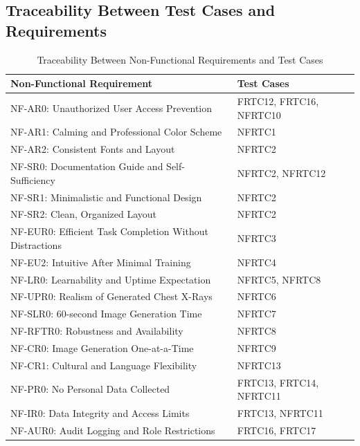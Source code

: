 \documentclass[12pt, titlepage]{article}
\begin{document}
\subsection{Traceability Between Test Cases and Requirements}

\begin{table}[H]
  \centering
  \caption{Traceability Between Non-Functional Requirements and Test Cases}
  \renewcommand{\arraystretch}{1.3}
  \begin{tabularx}{\textwidth}{|>{\raggedright\arraybackslash}X|>{\raggedright\arraybackslash}m{}|}
    \hline
    \textbf{Non-Functional Requirement} & \textbf{Test Cases} \\
    \hline
    NF-AR0: Unauthorized User Access Prevention & FRTC12, FRTC16, NFRTC10 \\
    \hline
    NF-AR1: Calming and Professional Color Scheme & NFRTC1 \\
    \hline
    NF-AR2: Consistent Fonts and Layout & NFRTC2 \\
    \hline
    NF-SR0: Documentation Guide and Self-Sufficiency & NFRTC2, NFRTC12 \\
    \hline
    NF-SR1: Minimalistic and Functional Design & NFRTC2 \\
    \hline
    NF-SR2: Clean, Organized Layout & NFRTC2 \\
    \hline
    NF-EUR0: Efficient Task Completion Without Distractions & NFRTC3 \\
    \hline
    NF-EU2: Intuitive After Minimal Training & NFRTC4 \\
    \hline
    NF-LR0: Learnability and Uptime Expectation & NFRTC5, NFRTC8 \\
    \hline
    NF-UPR0: Realism of Generated Chest X-Rays & NFRTC6 \\
    \hline
    NF-SLR0: 60-second Image Generation Time & NFRTC7 \\
    \hline
    NF-RFTR0: Robustness and Availability & NFRTC8 \\
    \hline
    NF-CR0: Image Generation One-at-a-Time & NFRTC9 \\
    \hline
    NF-CR1: Cultural and Language Flexibility & NFRTC13 \\
    \hline
    NF-PR0: No Personal Data Collected & FRTC13, FRTC14, NFRTC11 \\
    \hline
    NF-IR0: Data Integrity and Access Limits & FRTC13, NFRTC11 \\
    \hline
    NF-AUR0: Audit Logging and Role Restrictions & FRTC16, FRTC17 \\

\end{tabularx}
\end{table}
\end{document}
